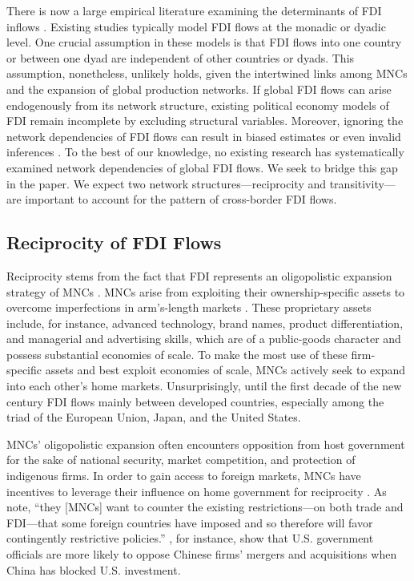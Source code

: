 \documentclass{article}
\begin{document}
There is now a large empirical literature examining the determinants of FDI inflows \citep[e.g.,][]{Noorbakhsh_et_al:2001,Yeaple:2003,Jensen:2003,Li_Resnick:2003,Buthe_Milner:2008,Li_Vashchilko:2010,Kerner:2009}. Existing studies typically model FDI flows at the monadic or dyadic level. One crucial assumption in these models is that FDI flows into one country or between one dyad are independent of other countries or dyads. This assumption, nonetheless, unlikely holds, given the intertwined links among MNCs and the expansion of global production networks. If global FDI flows can arise endogenously from its network structure, existing political economy models of FDI remain incomplete by excluding structural variables. Moreover, ignoring the network dependencies of FDI flows can result in biased estimates or even invalid inferences \citep{Cranmer_Desmarais:2011}. To the best of our knowledge, no existing research has systematically examined network dependencies of global FDI flows. We seek to bridge this gap in the paper. We expect two network structures---reciprocity and transitivity---are important to account for the pattern of cross-border FDI flows.

\subsection{Reciprocity of FDI Flows}
Reciprocity stems from the fact that FDI represents an oligopolistic expansion strategy of MNCs \citep{Hymer:1976,Kindleberger:1969}. MNCs arise from exploiting their ownership-specific assets to overcome imperfections in arm's-length markets \citep{Caves:1996,Dunning:1002}. These proprietary assets include, for instance, advanced technology, brand names, product differentiation, and managerial and advertising skills, which are of a public-goods character and possess substantial economies of scale. To make the most use of these firm-specific assets and best exploit economies of scale, MNCs actively seek to expand into each other's home markets. Unsurprisingly, until the first decade of the new century FDI flows mainly between developed countries, especially among the triad of the European Union, Japan, and the United States.

MNCs' oligopolistic expansion often encounters opposition from host government for the sake of national security, market competition, and protection of indigenous firms. In order to gain access to foreign markets, MNCs have incentives to leverage their influence on home government for reciprocity \citep{Milner:1988,Crystal:2003}. As \citet[6]{Crystal:2003} note, ``they [MNCs] want to counter the existing restrictions---on both trade and FDI---that some foreign countries have imposed and so therefore will favor contingently restrictive policies.'' \citet{Tingley:2015}, for instance, show that U.S. government officials are more likely to oppose Chinese firms' mergers and acquisitions when China has blocked U.S. investment.
\end{document}
